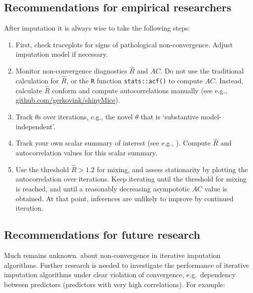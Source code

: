 \documentclass[Royal,times,sageh]{sagej}
\begin{document}
\hypertarget{recommendations-for-empirical-researchers}{%
\subsection{Recommendations for empirical researchers}\label{recommendations-for-empirical-researchers}}

After imputation it is always wise to take the following steps:

\begin{enumerate}
\def\labelenumi{\arabic{enumi}.}
\item
  First, check traceplots for signs of pathological non-convergence. Adjust imputation model if necessary.
\item
  Monitor non-convergence diagnostics \(\widehat{R}\) and \(AC\). Do not use the traditional calculation for \(\widehat{R}\), or the \texttt{R} function \texttt{stats::acf()} to compute \(AC\). Instead, calculate \(\widehat{R}\) conform \citet{veht19} and compute autocorrelations manually (see e.g., \href{https://github.com/gerkovink/shinyMice/tree/master/3.Thesis/1.SimulationStudy}{github.com/gerkovink/shinyMice}).
\item
  Track \(\theta\)s over iterations, e.g., the novel \(\theta\) that is `substantive model-independent'.
\item
  Track your own scalar summary of interest (see e.g., \citet{buur18}). Compute \(\widehat{R}\) and autocorrelation values for this scalar summary.
\item
  Use the threshold \(\widehat{R}>1.2\) for mixing, and assess stationarity by plotting the autocorrelation over iterations. Keep iterating until the threshold for mixing is reached, and until a reasonably decreasing asympototic \(AC\) value is obtained. At that point, inferences are unlikely to improve by continued iteration.
\end{enumerate}

\hypertarget{recommendations-for-future-research}{%
\subsection{Recommendations for future research}\label{recommendations-for-future-research}}

Much remains unknown. about non-convergence in iterative imputation algorithms. Further research is needed to investigate the performance of iterative imputation algorithms under clear violation of convergence, e.g.~dependency between predictors (predictors with very high correlations). For example:
\end{document}

